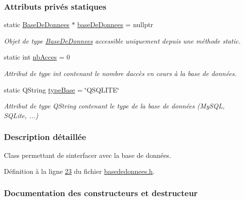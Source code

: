 \subsubsection*{Attributs privés statiques}
\begin{DoxyCompactItemize}
\item 
static \hyperlink{class_base_de_donnees}{Base\+De\+Donnees} $\ast$ \hyperlink{class_base_de_donnees_a822ba0b7cf85b1e48ced8efd3d65e266}{base\+De\+Donnees} = nullptr
\begin{DoxyCompactList}\small\item\em Objet de type \hyperlink{class_base_de_donnees}{Base\+De\+Donnees} accessible uniquement depuis une méthode static. \end{DoxyCompactList}\item 
static int \hyperlink{class_base_de_donnees_a5099ecb2922bb31d84cd5d4505298a29}{nb\+Acces} = 0
\begin{DoxyCompactList}\small\item\em Attribut de type int contenant le nombre d\textquotesingle{}accès en cours à la base de données. \end{DoxyCompactList}\item 
static Q\+String \hyperlink{class_base_de_donnees_ab682b82167f494496a6531bfe522b42b}{type\+Base} = \char`\"{}Q\+S\+Q\+L\+I\+TE\char`\"{}
\begin{DoxyCompactList}\small\item\em Attribut de type Q\+String contenant le type de la base de données (My\+S\+QL, S\+Q\+Lite, ...) \end{DoxyCompactList}\end{DoxyCompactItemize}


\subsubsection{Description détaillée}
Class permettant de s\textquotesingle{}interfacer avec la base de données. 

Définition à la ligne \hyperlink{basededonnees_8h_source_l00023}{23} du fichier \hyperlink{basededonnees_8h_source}{basededonnees.\+h}.



\subsubsection{Documentation des constructeurs et destructeur}
\mbox{\label{class_base_de_donnees_a10dd177f1008f675ab78c2221b2a6750}} 
